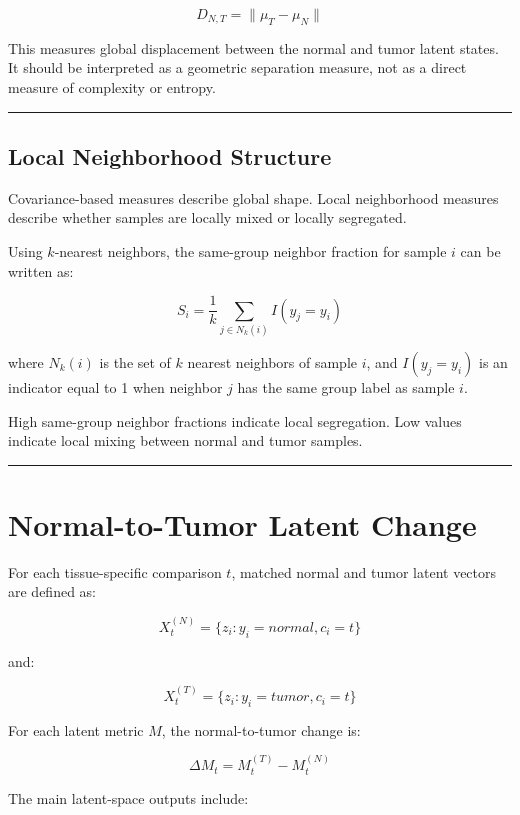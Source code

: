 \documentclass[
  letterpaper,
  DIV=11,
  numbers=noendperiod,
  openany,
  oneside]{scrreprt}
\begin{document}
\[
D_{N,T} = \lVert \mu_T - \mu_N \rVert
\]

This measures global displacement between the normal and tumor latent
states. It should be interpreted as a geometric separation measure, not
as a direct measure of complexity or entropy.

\begin{center}\rule{0.5\linewidth}{0.5pt}\end{center}

\subsection{Local Neighborhood
Structure}\label{local-neighborhood-structure}

Covariance-based measures describe global shape. Local neighborhood
measures describe whether samples are locally mixed or locally
segregated.

Using \(k\)-nearest neighbors, the same-group neighbor fraction for
sample \(i\) can be written as:

\[
S_i = \frac{1}{k} \sum_{j \in N_k(i)} I(y_j = y_i)
\]

where \(N_k(i)\) is the set of \(k\) nearest neighbors of sample \(i\),
and \(I(y_j = y_i)\) is an indicator equal to 1 when neighbor \(j\) has
the same group label as sample \(i\).

High same-group neighbor fractions indicate local segregation. Low
values indicate local mixing between normal and tumor samples.

\begin{center}\rule{0.5\linewidth}{0.5pt}\end{center}

\section{Normal-to-Tumor Latent
Change}\label{normal-to-tumor-latent-change}

For each tissue-specific comparison \(t\), matched normal and tumor
latent vectors are defined as:

\[
X_t^{(N)} = \{z_i : y_i = normal, c_i = t\}
\]

and:

\[
X_t^{(T)} = \{z_i : y_i = tumor, c_i = t\}
\]

For each latent metric \(M\), the normal-to-tumor change is:

\[
\Delta M_t = M_t^{(T)} - M_t^{(N)}
\]

The main latent-space outputs include:
\end{document}
